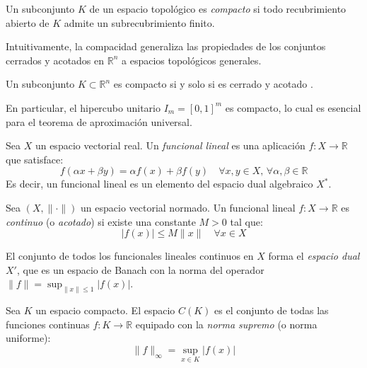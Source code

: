 \begin{definition}\label{def:espacio_compacto}
	Un subconjunto $K$ de un espacio topológico es \textit{compacto} si todo recubrimiento abierto de $K$ admite un subrecubrimiento finito.
\end{definition}

Intuitivamente, la compacidad generaliza las propiedades de los conjuntos cerrados y acotados en $\mathbb{R}^n$ a espacios topológicos generales.

\begin{theorem}\label{thm:heine_borel}
	Un subconjunto $K \subset \mathbb{R}^n$ es compacto si y solo si es cerrado y acotado \citep[Teorema~2.41]{Rudin1976}.
\end{theorem}

En particular, el hipercubo unitario $I_m = [0,1]^m$ es compacto, lo cual es esencial para el teorema de aproximación universal.

\begin{definition}\label{def:funcional_lineal}
	Sea $X$ un espacio vectorial real. Un \textit{funcional lineal} es una aplicación $f: X \to \mathbb{R}$ que satisface:
	\[
		f(\alpha x + \beta y) = \alpha f(x) + \beta f(y) \quad \forall x, y \in X, \, \forall \alpha, \beta \in \mathbb{R}
	\]
	Es decir, un funcional lineal es un elemento del espacio dual algebraico $X^*$.
\end{definition}

\begin{definition}\label{def:funcional_continuo}
	Sea $(X, \|\cdot\|)$ un espacio vectorial normado. Un funcional lineal $f: X \to \mathbb{R}$ es \textit{continuo} (o \textit{acotado}) si existe una constante $M > 0$ tal que:
	\[
		|f(x)| \leq M\|x\| \quad \forall x \in X
	\]
\end{definition}

El conjunto de todos los funcionales lineales continuos en $X$ forma el \textit{espacio dual} $X'$, que es un espacio de Banach con la norma del operador $\|f\| = \sup_{\|x\| \leq 1} |f(x)|$.

\begin{definition}[Espacio $C(K)$]\label{def:espacio_CK}
	Sea $K$ un espacio compacto. El espacio $C(K)$ es el conjunto de todas las funciones continuas $f: K \to \mathbb{R}$ equipado con la \textit{norma supremo} (o norma uniforme):
	\[
		\|f\|_\infty = \sup_{x \in K} |f(x)|
	\]
\end{definition}

